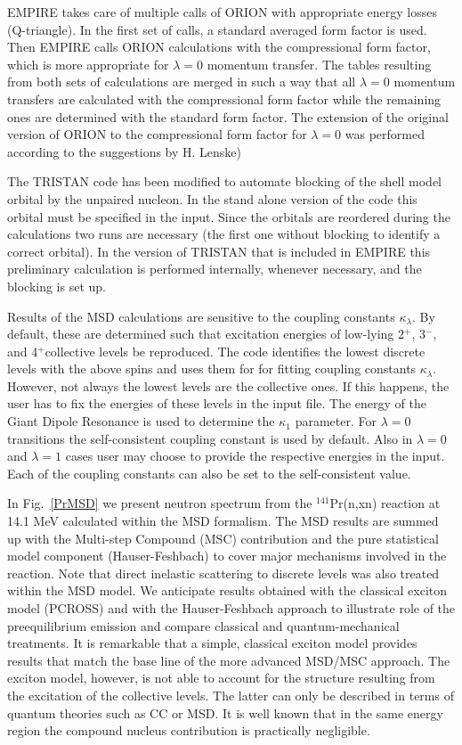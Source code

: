 \documentclass[twocolumn,amsmath,amssymb,10pt,groupedaddress,a4paper]{revtex4}
\begin{document}
EMPIRE takes care of multiple calls of ORION with appropriate
energy losses (Q-triangle). In the first set of calls, a standard
averaged form factor is used. Then EMPIRE calls ORION calculations
with the compressional form factor, which is more appropriate for
$\lambda=0$ momentum transfer. The tables resulting from both sets
of calculations are merged in such a way that all $\lambda=0$ momentum
transfers are calculated with the compressional form factor while
the remaining ones are determined with the standard form factor. The
extension of the original version of ORION to the compressional form
factor for $\lambda=0$ was performed according to the suggestions
by H. Lenske)

The TRISTAN code has been modified to automate blocking
of the shell model orbital by the unpaired nucleon. In the stand alone
version of the code this orbital must be specified in the input. Since
the orbitals are reordered during the calculations two runs are necessary
(the first one without blocking to identify a correct orbital). In
the version of TRISTAN that is included in EMPIRE this preliminary
calculation is performed internally, whenever necessary, and the blocking
is set up.

Results of the MSD calculations are sensitive to the coupling
constants $\kappa_{\lambda}$. By default, these are determined such
that excitation energies of low-lying 2$^{+}$, 3$^{-}$, and 4$^{+}$collective
levels be reproduced. The code identifies the lowest discrete levels
with the above spins and uses them for for fitting coupling constants
$\kappa_{\lambda}$. However, not always the lowest levels are the
collective ones. If this happens, the user has to fix the energies
of these levels in the input file. The energy of the Giant Dipole
Resonance is used to determine the $\kappa_{1}$ parameter. For $\lambda=0$
transitions the self-consistent coupling constant is used by default.
Also in $\lambda=0$ and $\lambda=1$ cases user may choose to provide
the respective energies in the input. Each of the coupling constants
can also be set to the self-consistent value.

In Fig.~\ref{PrMSD} we present neutron spectrum from the $^{141}$Pr(n,xn) reaction at 14.1 MeV
calculated within the MSD formalism. The MSD results are summed up with the Multi-step Compound (MSC) contribution and the pure statistical model component (Hauser-Feshbach) to cover major mechanisms involved in the reaction. Note that direct inelastic scattering to discrete levels was also treated within the MSD model. We anticipate results obtained with the classical exciton model (PCROSS) and with the Hauser-Feshbach approach to illustrate role of the preequilibrium emission and compare classical and quantum-mechanical treatments. It is remarkable that a simple, classical exciton model provides results that match the base line of the more advanced MSD/MSC approach. The exciton model, however, is not able to account for the structure resulting from the excitation of the collective levels. The latter can only be described in terms of quantum theories such as CC or MSD. It is well known that in the same energy region the compound nucleus contribution is practically negligible.
\end{document}
